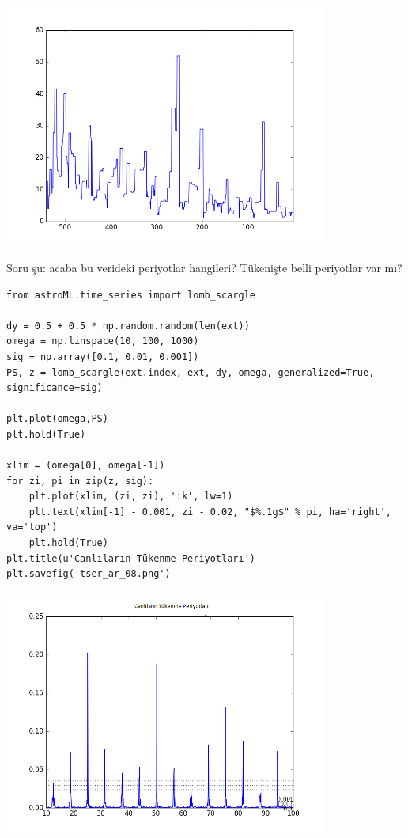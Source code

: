 \documentclass[12pt,fleqn]{article}\usepackage{../../common}
\begin{document}
\includegraphics[height=8cm]{tser_ar_09.png}

Soru şu: acaba bu verideki periyotlar hangileri? Tükenişte belli periyotlar var mı?

\begin{verbatim}
from astroML.time_series import lomb_scargle

dy = 0.5 + 0.5 * np.random.random(len(ext))
omega = np.linspace(10, 100, 1000)
sig = np.array([0.1, 0.01, 0.001])
PS, z = lomb_scargle(ext.index, ext, dy, omega, generalized=True, significance=sig)

plt.plot(omega,PS)
plt.hold(True)

xlim = (omega[0], omega[-1])
for zi, pi in zip(z, sig):
    plt.plot(xlim, (zi, zi), ':k', lw=1)
    plt.text(xlim[-1] - 0.001, zi - 0.02, "$%.1g$" % pi, ha='right', va='top')
    plt.hold(True)
plt.title(u'Canlıların Tükenme Periyotları')
plt.savefig('tser_ar_08.png')
\end{verbatim}

\includegraphics[height=8cm]{tser_ar_08.png}
\end{document}
